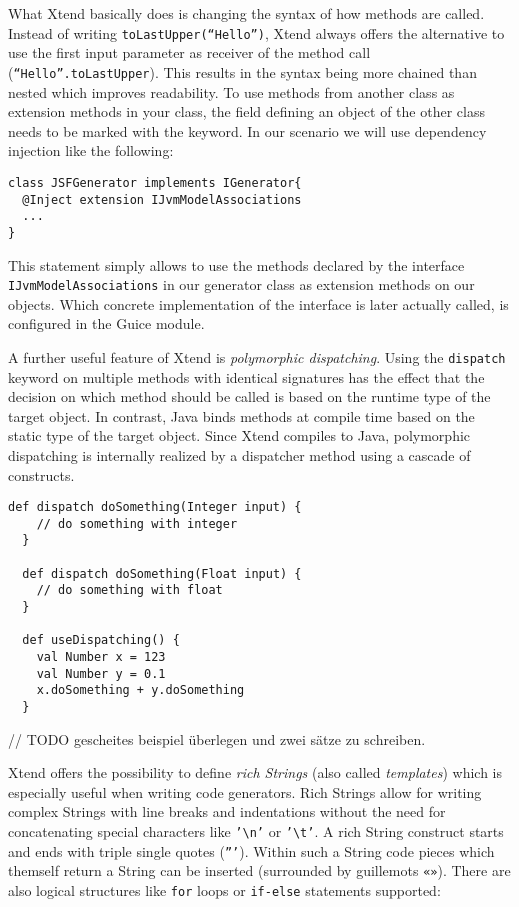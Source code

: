 What Xtend basically does is changing the syntax of how methods are called. Instead
of writing \texttt{toLastUpper(``Hello'')}, Xtend always offers the alternative to
use the first input parameter as receiver of the method call (\texttt{``Hello''.toLastUpper}).
This results in the syntax being more chained than nested which improves readability.
To use methods from another class as extension methods in your class, the field
defining an object of the other class needs to be marked with the 
keyword. In our scenario we will use dependency injection like the following:

\begin{lstlisting}[language=Xtend]
class JSFGenerator implements IGenerator{
  @Inject extension IJvmModelAssociations
  ...
}
\end{lstlisting}

This statement simply allows to use the methods declared by the interface \texttt{IJvmModelAssociations}
in our generator class as extension methods on our objects. Which concrete implementation of the
interface is later actually called, is configured in the Guice module.

A further useful feature of Xtend is \emph{polymorphic dispatching}. Using the \texttt{dispatch}
keyword on multiple methods with identical signatures has the effect that the 
decision on which method should be called is based on the runtime type of the
target object. In contrast, Java binds methods at compile time based on the static
type of the target object. Since Xtend compiles to Java, polymorphic dispatching
is internally realized by a dispatcher method using a cascade of 
constructs. 

\begin{lstlisting}[language=Xtend]
  def dispatch doSomething(Integer input) {
  	// do something with integer
  }
  
  def dispatch doSomething(Float input) {
  	// do something with float
  }
  
  def useDispatching() {
    val Number x = 123
    val Number y = 0.1
    x.doSomething + y.doSomething
  }
\end{lstlisting}

// TODO gescheites beispiel überlegen und zwei sätze zu schreiben.

Xtend offers the possibility to define \emph{rich Strings} (also called \emph{templates})
which is especially useful when writing code generators. Rich Strings allow for
writing complex Strings with line breaks and indentations without the need for
concatenating special characters like \texttt{'\textbackslash n'} or \texttt{'\textbackslash t'}. A rich String
construct starts and ends with triple single quotes (\texttt{'''}). Within such
a String code pieces which themself return a String can be inserted (surrounded by guillemots \texttt{«»}).
There are also logical structures like \texttt{for} loops or \texttt{if-else}
statements supported:

